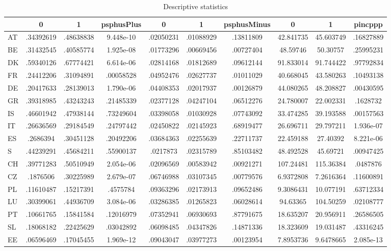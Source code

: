 \begin{table}[htbp]
\caption{\label{clabel} Descriptive statistics}\centering\medskip
\begin{tabular}{|l|c|c|c|c|c|c|c|c|c|}\hline  
 & 0  & 1  & psphusPlus  & 0  & 1  & psphusMinus  & 0  & 1  & pincppp  \\ \hline  
AT & .34392619 & .48638838 & 9.448e-10 & .02050231 & .01088929 & .13811809 & 42.841735 & 45.603749 & .16827889 \\ \hline 
BE & .31432545 & .40585774 & 1.925e-08 & .01773296 & .00669456 & .00727404 & 48.59746 & 50.30757 & .25995231 \\ \hline 
DK & .59340126 & .67774421 & 6.614e-06 & .02814168 & .01812689 & .09612144 & 91.833014 & 91.744422 & .97792834 \\ \hline 
FR & .24412206 & .31094891 & .00058528 & .04952476 & .02627737 & .01011029 & 40.668045 & 43.580263 & .10493138 \\ \hline 
DE & .20417633 & .28139013 & 1.790e-06 & .04408353 & .02017937 & .00126879 & 44.080265 & 48.208827 & .00430595 \\ \hline 
GR & .39318985 & .43243243 & .21485339 & .02377128 & .04247104 & .06512276 & 24.780007 & 22.002331 & .1628732 \\ \hline 
IS & .46601942 & .47938144 & .73249604 & .03398058 & .01030928 & .07743092 & 33.474285 & 39.193588 & .00157563 \\ \hline 
IT & .26636569 & .29184549 & .24797442 & .02450822 & .02145923 & .68919477 & 26.696711 & 29.797211 & 1.936e-07 \\ \hline 
ES & .2686394 & .30451128 & .20492206 & .03684363 & .02255639 & .22711737 & 22.459188 & 27.40392 & 8.221e-06 \\ \hline 
S & .44239291 & .45684211 & .55900137 & .0217873 & .02315789 & .85103482 & 48.492528 & 45.69721 & .00947425 \\ \hline 
CH & .39771283 & .50510949 & 2.054e-06 & .02096569 & .00583942 & .00921271 & 107.24481 & 115.36384 & .0487876 \\ \hline 
CZ & .1876506 & .30225989 & 2.679e-07 & .06746988 & .03107345 & .00779576 & 6.9372808 & 7.2616364 & .11600891 \\ \hline 
PL & .11610487 & .15217391 & .4575784 & .09363296 & .02173913 & .09652486 & 9.3086431 & 10.077191 & .63712334 \\ \hline 
LU & .30399061 & .44936709 & 3.084e-06 & .03286385 & .01265823 & .06028614 & 94.63365 & 104.50259 & .02108777 \\ \hline 
PT & .10661765 & .15841584 & .12016979 & .07352941 & .06930693 & .87791675 & 18.635207 & 20.956911 & .26586505 \\ \hline 
SL & .18068182 & .22425629 & .03042892 & .06098485 & .04347826 & .14871336 & 18.323609 & 19.031487 & .43316245 \\ \hline 
EE & .06596469 & .17045455 & 1.969e-12 & .09043047 & .03977273 & .00123954 & 7.8953736 & 9.6478665 & 2.085e-13 \\ \hline 
  \end{tabular}
\end{table}
